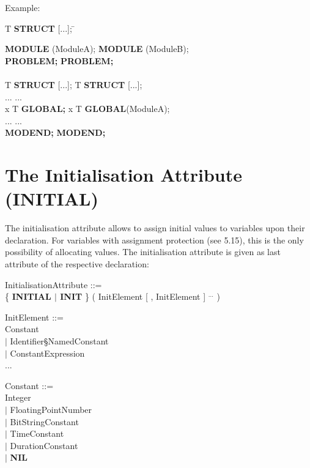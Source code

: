Example:

\begin{tabbing}
 T {\bf STRUCT} [...]; \hspace{2cm} \= \kill

{\bf MODULE} (ModuleA);            \> {\bf MODULE} (ModuleB);\\
{\bf PROBLEM;}                      \> {\bf PROBLEM;}\\
                                    \> \\
 T {\bf STRUCT} [...]; \>  T {\bf STRUCT} [...];\\
\x ...                              \> \x ... \\
 x T {\bf GLOBAL;}      \>  x T {\bf GLOBAL}(ModuleA); \\
\x ...                              \> \x ...\\
{\bf MODEND;}                       \> {\bf MODEND;}
\end{tabbing}


\section{The Initialisation Attribute (INITIAL)}   %

The initialisation attribute allows to assign initial values to
variables upon their declaration. For variables with assignment
protection (see 5.15), this is the only possibility of allocating
values. The initialisation attribute is given as last attribute of the
respective declaration:

InitialisationAttribute ::=\\
\x \{ {\bf INITIAL $\mid$ INIT} \} ( InitElement [ , InitElement ] $^{...}$ )

InitElement ::=\\
\x Constant\\
\x $\mid$ Identifier\S NamedConstant\\
\x $\mid$ ConstantExpression\\
\x ...

Constant ::=\\
\x Integer\\
\x $\mid$ FloatingPointNumber\\
\x $\mid$ BitStringConstant\\
\x $\mid$ TimeConstant\\
\x $\mid$ DurationConstant\\
\x $\mid$ {\bf NIL}

